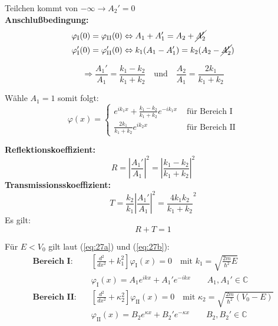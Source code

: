 Teilchen kommt von $-\infty \rightarrow A_2' = 0$\\
\textbf{Anschlußbedingung:}
\begin{align}
  \varphi_\textrm{I}(0) 
  = \varphi_\textrm{II}(0) & \Leftrightarrow  A_1 + A_1' 
  = A_2 + \cancel{A_2'}\label{eq1:Stufe-eq1}\\
 \varphi'_\textrm{I}(0) 
 = \varphi'_\textrm{II}(0) & \Leftrightarrow  k_1(A_1 - A_1') 
 = k_2(A_2 - \cancel{A_2'}) \label{eq2:Stufe-eq2}
\end{align}

\begin{equation*}
  \Rightarrow \frac{A_1'}{A_1} = \frac{k_1-k_2}{k_1+k_2} \quad
  \mbox{und} \quad
  \frac{A_2}{A_1} = \frac{2k_1}{k_1+k_2}
\end{equation*}

Wähle $A_1 = 1$ somit folgt:
\begin{equation*}
  \varphi(x) =
  \begin{cases}
    e^{ik_1x}+\frac{k_1-k_2}{k_1+k_2} e^{-ik_1x} & \mbox{ für Bereich I} \\
    \frac{2k_1}{k_1+k_2} e^{ik_2x} & \mbox{ für Bereich II}
  \end{cases}
\end{equation*}

\textbf{Reflektionskoeffizient:}
  \begin{equation}
    \label{eq:29}
    R= \left|\frac{A_1'}{A_1}\right|^2 
    = \left|\frac{k_1-k_2}{k_1+k_2}\right|^2
  \end{equation}
\textbf{Transmissionsskoeffizient:}
  \begin{equation}
    \label{eq:30}
    T= \frac{k_2}{k_1}\left|\frac{A_1'}{A_1}\right|^2 
    = \frac{4k_1k_2}{k_1+k_2}^2
  \end{equation}
Es gilt:
  \begin{equation}
    \label{eq:31}
    \boxed{R+T=1}
  \end{equation}

\bigskip
Für $E<V_0$ gilt laut (\ref{eq:27a}) und (\ref{eq:27b}):
\begin{align*}
    \textbf{Bereich I:} \quad &\left[\frac{d^2}{dx^2}+k_1^2\right]\varphi_\textrm{I}(x)=0 
    \quad \textrm{mit } k_1=\sqrt{\frac{2m}{\hbar^2}E} \\
    &\varphi_\textrm{I}(x)=A_1e^{ikx}+A_1'e^{-ikx} \qquad A_1,A_1' \in \mathbb{C} \\[2ex]
    \textbf{Bereich II:} \quad &\left[\frac{d^2}{dx^2}+\kappa_2^2\right]\varphi_\textrm{II}(x)=0
    \quad  \textrm{mit } \kappa_2=\sqrt{\frac{2m}{\hbar^2}(V_0-E)} \\
     &\varphi_\textrm{II}(x)=B_2e^{\kappa x}+B_2'e^{-\kappa x} \qquad B_2,B_2' \in \mathbb{C}
\end{align*}

